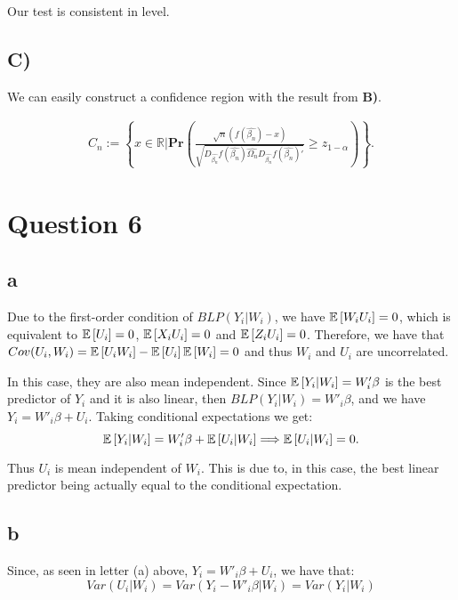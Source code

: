 \documentclass[12pt]{paper}
\begin{document}
Our test is consistent in level.



\subsection*{C)}


We can easily construct a confidence region with the result from \textbf{B)}.

\begin{align*}
C_n:=\left \{ 
x \in \mathbb{R}|
\textbf{Pr}\left(
\frac{\sqrt{n}(f(\hat{\beta_n})-x)}{\sqrt{D_{\hat{\beta_n}}f(\hat{\beta_n}) \hat{\Omega_n} D_{\hat{\beta_n}}f(\hat{\beta_n})'}}
\geq
z_{1-\alpha}
\right)
\right \}.
\end{align*}





\section*{Question 6}

\subsection*{a}

Due to the first-order condition of $BLP(Y_i|W_i)$, we have $\mathbb{E} \left [ W_iU_i \right ]=0$, which is equivalent to $\mathbb{E} \left [ U_i \right ]=0$, $\mathbb{E} \left [ X_iU_i \right ]=0$ and $\mathbb{E} \left [ Z_iU_i \right ]=0$. Therefore, we have that $Cov(U_i,W_i)=\mathbb{E} \left [ U_iW_i \right ]-\mathbb{E} \left [ U_i \right ]\mathbb{E} \left [ W_i \right ]=0$ and thus $W_i$ and $U_i$ are uncorrelated.

In this case, they are also mean independent. Since $\mathbb{E} \left [ Y_i|W_i \right ]=W'_i\beta$ is the best predictor of $Y_i$ and it is also linear, then $BLP(Y_i|W_i)=W'_i\beta$, and we have $Y_i=W'_i\beta+U_i$. Taking conditional expectations we get:
\begin{equation}
\mathbb{E} \left [ Y_i|W_i \right ]=W'_i\beta+\mathbb{E} \left [ U_i|W_i \right ] \Longrightarrow \mathbb{E} \left [ U_i|W_i \right ]=0.
\end{equation}

Thus $U_i$ is mean independent of $W_i$. This is due to, in this case, the best linear predictor being actually equal to the conditional expectation. 

\subsection*{b}

Since, as seen in letter (a) above, $Y_i=W'_i\beta+U_i$, we have that:
\begin{equation}
Var(U_i|W_i)=Var(Y_i-W'_i\beta|W_i)=Var(Y_i|W_i)
\end{equation}
\end{document}
